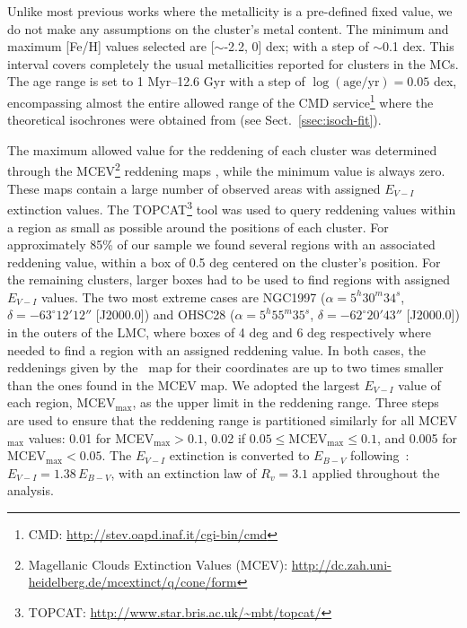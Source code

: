 \documentclass{aa}
\begin{document}
Unlike most previous works where the metallicity is a pre-defined fixed
value, we do not make any assumptions on the cluster's metal content. The
minimum and maximum [Fe/H] values selected are [$\sim$-2.2, 0] dex; with a step
of $\sim$0.1 dex. This interval covers completely the usual metallicities
reported for clusters in the MCs.
The age range is set to 1 Myr--12.6 Gyr with a step of
$\log\mathrm{(age/yr)}=0.05$ dex, encompassing almost the entire allowed range
of the CMD service\footnote{CMD\@: \url{http://stev.oapd.inaf.it/cgi-bin/cmd}}
where the theoretical isochrones were obtained from (see
Sect.~\ref{ssec:isoch-fit}).

The maximum allowed value for the reddening of each cluster was determined
through the MCEV\footnote{Magellanic Clouds Extinction Values (MCEV):
\url{http://dc.zah.uni-heidelberg.de/mcextinct/q/cone/form}} reddening maps
\citep{Haschke_2011}, while the minimum value is always zero.
%
These maps contain a large number of observed areas with assigned $E_{V-I}$
extinction values.
The TOPCAT\footnote{TOPCAT\@: \url{http://www.star.bris.ac.uk/~mbt/topcat/}}
tool was used to query reddening values within a region as small as possible
around the positions of each cluster.
For approximately 85\% of our sample we found several regions with an associated
reddening value, within a box of 0.5 deg centered on the cluster's position.
For the remaining clusters, larger boxes had to be used to find regions with
assigned $E_{V-I}$ values. The two most extreme cases are NGC1997
($\alpha{=}5^h30^m34^s$, $\delta{=}-63^\circ12'12''$ [J2000.0]) and OHSC28
($\alpha{=}5^h55^m35^s$, $\delta{=}-62^\circ20'43''$ [J2000.0]) in the outers
of the LMC, where boxes of 4 deg and 6 deg respectively where needed to find a
region with an assigned reddening value. In both cases, the reddenings given by
the~\cite{Schlafly_2011} map for their coordinates are up to two times smaller
than the ones found in the MCEV map.
%
We adopted the largest $E_{V-I}$ value of each region, MCEV$_{\max}$, as the
upper limit in the reddening range. Three steps are used to ensure that the
reddening range is partitioned similarly for all MCEV$_{\max}$ values: 0.01 for
MCEV$_{\max} {>}0.1$, 0.02 if $0.05{\leq}\mathrm{MCEV}_{\max}{\leq}0.1$, and
0.005 for MCEV$_{\max}{<}0.05$.
%
The $E_{V-I}$ extinction is converted to $E_{B-V}$
following~\cite{Tammann_2003}: $E_{V-I}{=}1.38\,E_{B-V}$, with an extinction
law of $R_v{=}3.1$ applied throughout the analysis.
\end{document}
